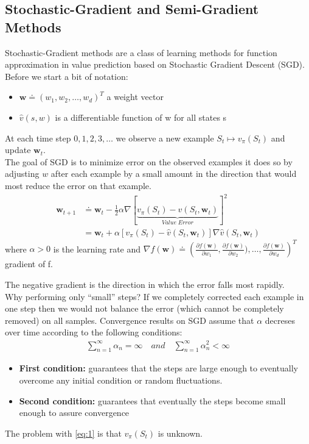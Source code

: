 \subsection{Stochastic-Gradient and Semi-Gradient Methods}
Stochastic-Gradient methods are a class of learning methods for function approximation in value
prediction based on Stochastic Gradient Descent (SGD).\\

Before we start a bit of notation:
\begin{itemize}
    \item $\mathbf{w}\doteq(w_1,w_2,\dots,w_d)^T$ a weight vector
    \item $\hat{v}(s, w)$ is a differentiable function of w for all states s
\end{itemize}
At each time step $0,1,2,3,\dots$ we observe a new example $S_t\mapsto v_\pi(S_t)$ and update $\mathbf{w}_t$.\\

The goal of SGD is to minimize error on the observed examples it does so by adjusting $w$ after each example by a small amount in the direction that would most reduce the error on that example.
\begin{align}
    \mathbf{w}_{t+1}&\doteq \mathbf{w}_{t}-\frac{1}{2}\alpha\nabla[\underbrace{v_\pi(S_t)-\hat{v}(S_t, \mathbf{w}_{t})}_{Value\;Error}]^2 \\
    &=\mathbf{w}_{t}+\alpha[v_\pi(S_t)-\hat{v}(S_t, \mathbf{w}_{t})]\nabla \hat{v}(S_t, \mathbf{w}_{t})
    \label{eq:1}
\end{align}
where $\alpha>0$ is the learning rate and $\nabla f(\mathbf{w})\doteq\left(\frac{\partial f(\mathbf{w})}{\partial w_1}, \frac{\partial f(\mathbf{w})}{\partial w_2}), \dots, \frac{\partial f(\mathbf{w})}{\partial w_d}\right)^T$ gradient of f.

The negative gradient is the direction in which the error falls most rapidly.\\

Why performing only “small” steps? If we completely corrected each example in one step then we would not balance the error (which cannot be completely removed) on all samples.
Convergence results on SGD assume that $\alpha$ decreses over time according to the following conditions:
\begin{align*}
    \sum^\infty_{n=1}\alpha_n=\infty\quad and \quad \sum^\infty_{n=1}\alpha^2_n<\infty
\end{align*}
\begin{itemize}
    \item \textbf{First condition:} guarantees that the steps are large enough to eventually overcome any initial condition or random fluctuations.
    \item \textbf{Second condition:} guarantees that eventually the steps become small enough to assure convergence
\end{itemize}
The problem with \ref{eq:1} is that $v_\pi(S_t)$ is unknown.

